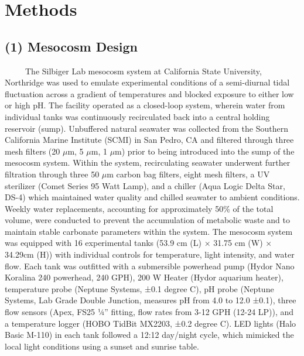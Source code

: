 \documentclass[
  12pt,
]{article}
\begin{document}
\newpage

\hypertarget{methods}{%
\section{Methods}\label{methods}}

\vspace{0.5cm}

\hypertarget{mesocosm-design}{%
\subsection{(1) Mesocosm Design}\label{mesocosm-design}}

~~~~~The Silbiger Lab mesocosm system at California State University,
Northridge was used to emulate experimental conditions of a semi-diurnal
tidal fluctuation across a gradient of temperatures and blocked exposure
to either low or high pH. The facility operated as a closed-loop system,
wherein water from individual tanks was continuously recirculated back
into a central holding reservoir (sump). Unbuffered natural seawater was
collected from the Southern California Marine Institute (SCMI) in San
Pedro, CA and filtered through three mesh filters (20 \(\mu\)m, 5
\(\mu\)m, 1 \(\mu\)m) prior to being introduced into the sump of the
mesocosm system. Within the system, recirculating seawater underwent
further filtration through three 50 \(\mu\)m carbon bag filters, eight
mesh filters, a UV sterilizer (Comet Series 95 Watt Lamp), and a chiller
(Aqua Logic Delta Star, DS-4) which maintained water quality and chilled
seawater to ambient conditions. Weekly water replacements, accounting
for approximately 50\% of the total volume, were conducted to prevent
the accumulation of metabolic waste and to maintain stable carbonate
parameters within the system. The mesocosm system was equipped with 16
experimental tanks (53.9 cm (L) × 31.75 cm (W) × 34.29cm (H)) with
individual controls for temperature, light intensity, and water flow.
Each tank was outfitted with a submersible powerhead pump (Hydor Nano
Koralina 240 powerhead, 240 GPH), 200 W Heater (Hydor aquarium heater),
temperature probe (Neptune Systems, ±0.1 degree C), pH probe (Neptune
Systems, Lab Grade Double Junction, measures pH from 4.0 to 12.0 ±0.1),
three flow sensors (Apex, FS25 ¼'' fitting, flow rates from 3-12 GPH
(12-24 LP)), and a temperature logger (HOBO TidBit MX2203, ±0.2 degree
C). LED lights (Halo Basic M-110) in each tank followed a 12:12
day/night cycle, which mimicked the local light conditions using a
sunset and sunrise table.
\end{document}
